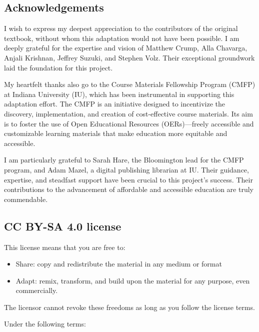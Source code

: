 \documentclass[
  letterpaper,
  DIV=11,
  numbers=noendperiod]{scrreprt}
\providecommand{\tightlist}{%
  \setlength{\itemsep}{0pt}\setlength{\parskip}{0pt}}
\begin{document}
\subsection*{Acknowledgements}\label{acknowledgements}

I wish to express my deepest appreciation to the contributors of the
original textbook, without whom this adaptation would not have been
possible. I am deeply grateful for the expertise and vision of Matthew
Crump, Alla Chavarga, Anjali Krishnan, Jeffrey Suzuki, and Stephen Volz.
Their exceptional groundwork laid the foundation for this project.

My heartfelt thanks also go to the Course Materials Fellowship Program
(CMFP) at Indiana University (IU), which has been instrumental in
supporting this adaptation effort. The CMFP is an initiative designed to
incentivize the discovery, implementation, and creation of
cost-effective course materials. Its aim is to foster the use of Open
Educational Resources (OERs)---freely accessible and customizable
learning materials that make education more equitable and accessible.

I am particularly grateful to Sarah Hare, the Bloomington lead for the
CMFP program, and Adam Mazel, a digital publishing librarian at IU.
Their guidance, expertise, and steadfast support have been crucial to
this project's success. Their contributions to the advancement of
affordable and accessible education are truly commendable.

\subsection*{CC BY-SA 4.0 license}\label{cc-by-sa-4.0-license}

This license means that you are free to:

\begin{itemize}
\tightlist
\item
  Share: copy and redistribute the material in any medium or format
\item
  Adapt: remix, transform, and build upon the material for any purpose,
  even commercially.
\end{itemize}

The licensor cannot revoke these freedoms as long as you follow the
license terms.

Under the following terms:
\end{document}
